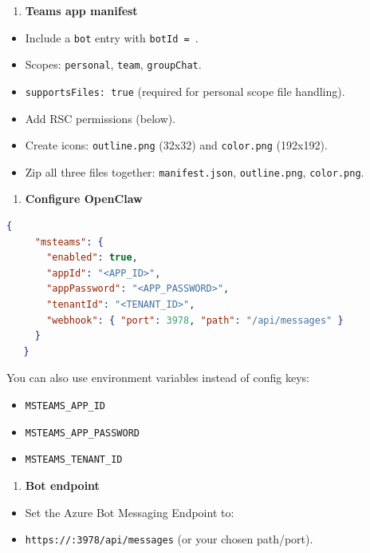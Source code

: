 \begin{enumerate}
  \item \textbf{Teams app manifest}
\end{enumerate}

\begin{itemize}
  \item Include a \texttt{bot} entry with \texttt{botId = }.
  \item Scopes: \texttt{personal}, \texttt{team}, \texttt{groupChat}.
  \item \texttt{supportsFiles: true} (required for personal scope file handling).
  \item Add RSC permissions (below).
  \item Create icons: \texttt{outline.png} (32x32) and \texttt{color.png} (192x192).
  \item Zip all three files together: \texttt{manifest.json}, \texttt{outline.png}, \texttt{color.png}.
\end{itemize}


\begin{enumerate}
  \item \textbf{Configure OpenClaw}
\end{enumerate}


\begin{lstlisting}[language=json]
   {
     "msteams": {
       "enabled": true,
       "appId": "<APP_ID>",
       "appPassword": "<APP_PASSWORD>",
       "tenantId": "<TENANT_ID>",
       "webhook": { "port": 3978, "path": "/api/messages" }
     }
   }
\end{lstlisting}


You can also use environment variables instead of config keys:
\begin{itemize}
  \item \texttt{MSTEAMS\_APP\_ID}
  \item \texttt{MSTEAMS\_APP\_PASSWORD}
  \item \texttt{MSTEAMS\_TENANT\_ID}
\end{itemize}


\begin{enumerate}
  \item \textbf{Bot endpoint}
\end{enumerate}

\begin{itemize}
  \item Set the Azure Bot Messaging Endpoint to:
  \item \texttt{https://:3978/api/messages} (or your chosen path/port).
\end{itemize}


